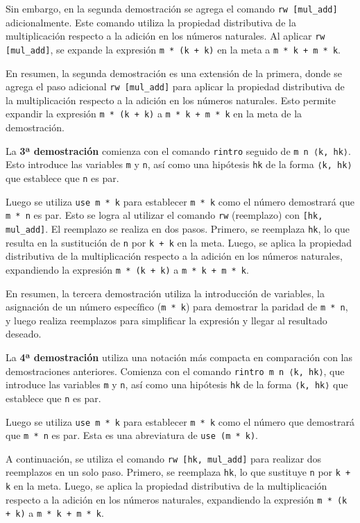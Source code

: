 Sin embargo, en la segunda demostración se agrega el comando
\texttt{rw [mul\_add]} adicionalmente. Este comando utiliza la propiedad
distributiva de la multiplicación respecto a la adición en los números
naturales. Al aplicar \texttt{rw [mul\_add]}, se expande la expresión
\texttt{m * (k + k)} en la meta a \texttt{m * k + m * k}.

En resumen, la segunda demostración es una extensión de la primera,
donde se agrega el paso adicional \texttt{rw [mul\_add]} para aplicar la
propiedad distributiva de la multiplicación respecto a la adición en los
números naturales. Esto permite expandir la expresión \texttt{m * (k + k)} a
\texttt{m * k + m * k} en la meta de la demostración.

La \textbf{3ª demostración} comienza con el comando \texttt{rintro} seguido de
\texttt{m n ⟨k, hk⟩}. Esto introduce las variables \texttt{m} y \texttt{n}, así como una hipótesis
\texttt{hk} de la forma \texttt{⟨k, hk⟩} que establece que \texttt{n} es par.

Luego se utiliza \texttt{use m * k} para establecer \texttt{m * k} como el número
demostrará que \texttt{m * n} es par. Esto se logra al utilizar el comando \texttt{rw}
(reemplazo) con \texttt{[hk, mul\_add]}. El reemplazo se realiza en dos
pasos. Primero, se reemplaza \texttt{hk}, lo que resulta en la sustitución de
\texttt{n} por \texttt{k + k} en la meta. Luego, se aplica la propiedad distributiva
de la multiplicación respecto a la adición en los números naturales,
expandiendo la expresión \texttt{m * (k + k)} a \texttt{m * k + m * k}.

En resumen, la tercera demostración utiliza la introducción de
variables, la asignación de un número específico (\texttt{m * k}) para
demostrar la paridad de \texttt{m * n}, y luego realiza reemplazos para
simplificar la expresión y llegar al resultado deseado.

La \textbf{4ª demostración} utiliza una notación más compacta en comparación
con las demostraciones anteriores. Comienza con el comando
\texttt{rintro m n ⟨k, hk⟩}, que introduce las variables \texttt{m} y \texttt{n}, así como
una hipótesis \texttt{hk} de la forma \texttt{⟨k, hk⟩} que establece que \texttt{n} es par.

Luego se utiliza \texttt{use m * k} para establecer \texttt{m * k} como el número que
demostrará que \texttt{m * n} es par. Esta es una abreviatura de \texttt{use (m * k)}.

A continuación, se utiliza el comando \texttt{rw [hk, mul\_add]} para realizar
dos reemplazos en un solo paso. Primero, se reemplaza \texttt{hk}, lo que
sustituye \texttt{n} por \texttt{k + k} en la meta. Luego, se aplica la propiedad
distributiva de la multiplicación respecto a la adición en los números
naturales, expandiendo la expresión \texttt{m * (k + k)} a \texttt{m * k + m * k}.

